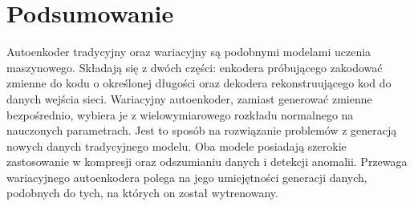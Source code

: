 \documentclass[a4paper,12pt,oneside]{book} %
\begin{document}
\chapter{Podsumowanie}
Autoenkoder tradycyjny oraz wariacyjny są podobnymi modelami uczenia maszynowego. Składają się z dwóch części: enkodera próbującego zakodować zmienne do kodu o określonej długości oraz dekodera rekonstruującego kod do danych wejścia sieci. Wariacyjny autoenkoder, zamiast generować zmienne bezpośrednio, wybiera je z wielowymiarowego rozkładu normalnego na nauczonych parametrach. Jest to sposób na rozwiązanie problemów z generacją nowych danych tradycyjnego modelu. Oba modele posiadają szerokie zastosowanie w kompresji oraz odszumianiu danych i detekcji anomalii. Przewaga wariacyjnego autoenkodera polega na jego umiejętności generacji danych, podobnych do tych, na których on został wytrenowany. 


\listoffigures{} %



\end{document}
